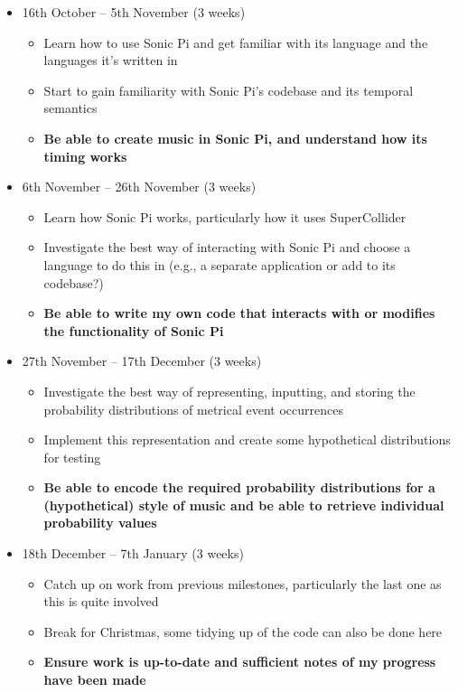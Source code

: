 \documentclass[12pt,twoside,openright]{report}
\begin{document}
\begin{refsection}
\begin{itemize}
    \item 16th October -- 5th November (3 weeks)
    \begin{itemize}
    	\item Learn how to use Sonic Pi and get familiar with its language and the languages it's written in
    	\item Start to gain familiarity with Sonic Pi's codebase and its temporal semantics
    	\item \textbf{Be able to create music in Sonic Pi, and understand how its timing works}
    \end{itemize}
    \item 6th November -- 26th November (3 weeks)
    \begin{itemize}
    	\item Learn how Sonic Pi works, particularly how it uses SuperCollider
    	\item Investigate the best way of interacting with Sonic Pi and choose a language to do this in (e.g., a separate application or add to its codebase?)
    	\item \textbf{Be able to write my own code that interacts with or modifies the functionality of Sonic Pi}
    \end{itemize}
    \item 27th November -- 17th December (3 weeks)
    \begin{itemize}
    	\item Investigate the best way of representing, inputting, and storing the probability distributions of metrical event occurrences
    	\item Implement this representation and create some hypothetical distributions for testing
    	\item \textbf{Be able to encode the required probability distributions for a (hypothetical) style of music and be able to retrieve individual probability values}
    \end{itemize}
    \item 18th December -- 7th January (3 weeks)
    \begin{itemize}
    	\item Catch up on work from previous milestones, particularly the last one as this is quite involved
    	\item Break for Christmas, some tidying up of the code can also be done here
    	\item \textbf{Ensure work is up-to-date and sufficient notes of my progress have been made}

\end{itemize}
\end{itemize}
\end{refsection}
\end{document}
